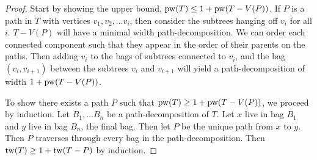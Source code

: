 \begin{proof}[Proof]
	Start by showing the upper bound, \(\operatorname{pw}(T) \leq 1 + \operatorname{pw}(T - V(P))\). If \(P\) is a path in \(T\) with vertices \(v_1, v_2, \ldots v_i\), then consider the subtrees hanging off \(v_i\) for all \(i\). \(T - V(P)\) will have a minimal width path-decomposition. We can order each connected component such that they appear in the order of their parents on the paths. Then adding \(v_i\) to the bags of subtrees connected to \(v_i\), and the bag \((v_i, v_{i+1})\) between the subtrees \(v_i\) and \(v_{i + 1}\) will yield a path-decomposition of width \(1 + \operatorname{pw}(T - V(P))\).
	\par
	To show there exists a path \(P\) such that \(\operatorname{pw}(T) \geq 1 + \operatorname{pw}(T - V(P))\), we proceed by induction. Let \(B_1, \ldots B_n\) be a path-decomposition of \(T\). Let \(x\) live in bag \(B_1\) and \(y\) live in bag \(B_n\), the final bag. Then let \(P\) be the unique path from \(x\) to \(y\). Then \(P\) traverses through every bag in the path-decomposition. Then \(\operatorname{tw}(T) \geq 1 + \operatorname{tw}(T - P)\) by induction.
\end{proof}
